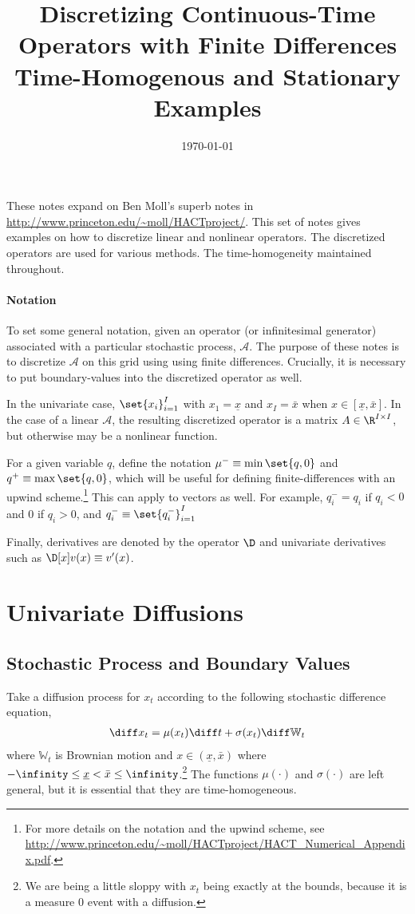 \documentclass[11pt]{etk-article}
\begin{document}
\title{Discretizing Continuous-Time Operators with Finite Differences\\
	Time-Homogenous and Stationary Examples}
\date{\today}
\maketitle
These notes expand on Ben Moll's superb notes in \url{http://www.princeton.edu/~moll/HACTproject/}.  This set of notes gives examples on how to discretize linear and nonlinear operators.  The discretized operators are used for various methods.  The time-homogeneity maintained throughout.
\paragraph{Notation}
To set some general notation, given an operator (or infinitesimal generator) associated with a particular stochastic process, $\mathcal{A}$.  The purpose of these notes is to discretize $\mathcal{A}$ on this grid using using finite differences.  Crucially, it is necessary to put boundary-values into the discretized operator as well.

In the univariate case, $\set{x_i}_{i=1}^I$ with $x_1 = \underline{x}$ and $x_I = \bar{x}$ when $x \in [\underline{x}, \bar{x}]$.    In the case of a linear $\mathcal{A}$, the resulting discretized operator is a matrix $A \in \R^{I \times I}$, but otherwise may be a nonlinear function.

For a given variable $q$, define the notation $\mu^{-} \equiv \min\set{q,0}$ and $q^{+} \equiv \max\set{q,0}$, which will be useful for defining finite-differences with an upwind scheme.\footnote{For more details on the notation and the upwind scheme, see \url{http://www.princeton.edu/~moll/HACTproject/HACT_Numerical_Appendix.pdf}.}   This can apply to vectors as well. For example, $q_i^{-} = q_i$ if $q_i < 0$ and $0$ if $q_i > 0$, and $q_i^{-} \equiv \set{q^{-}_i}_{i=1}^{I}$

Finally,  derivatives are denoted by the operator $\D$ and univariate derivatives such as $\D[x]v(x) \equiv v'(x)$.

\section{Univariate Diffusions}
\subsection{Stochastic Process and Boundary Values}
Take a diffusion process for $x_t$ according to the following stochastic difference equation,
\begin{align}
\diff x_t = \mu(x_t)\diff t + \sigma(x_t)\diff\mathbb{W}_t\label{eq:x-SDE}
\end{align}
where $\mathbb{W}_t$ is Brownian motion and $x \in (\underline{x}, \bar{x})$ where $-\infinity \leq \underline{x} < \bar{x} \leq \infinity$.\footnote{We are being a little sloppy with $x_t$ being exactly at the bounds, because it is a measure $0$ event with a diffusion.}  The functions $\mu(\cdot)$ and $\sigma(\cdot)$ are left general, but it is essential that they are time-homogeneous.
\end{document}
